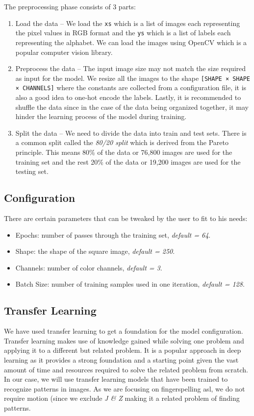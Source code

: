 \documentclass[twocolumn]{article}
\begin{document}
The preprocessing phase consists of 3 parts:
\begin{enumerate}
  \item Load the data – We load the \texttt{xs} which is a list of images each 
  representing the pixel values in RGB format and the \texttt{ys} which is a 
  list of labels each representing the alphabet. We can load the images using 
  OpenCV which is a popular computer vision library.
  \item Preprocess the data – The input image size may not match the size 
  required as input for the model. We resize all the images to the shape 
  \texttt{[SHAPE × SHAPE × CHANNELS]} where the constants are collected from a 
  configuration file, it is also a good idea to one-hot encode the labels. 
  Lastly, it is recommended to shuffle the data since in the case of the data 
  being organized together, it may hinder the learning process of the model 
  during training.
  \item Split the data – We need to divide the data into train and test sets. 
  There is a common split called the \textit{80/20 split} which is derived 
  from the Pareto principle. This means 80\% of the data or 76,800 images are 
  used for the training set and the rest 20\% of the data or 19,200 images are 
  used for the testing set.
\end{enumerate}

\subsection{Configuration}

There are certain parameters that can be tweaked by the user to fit to his needs:
\begin{itemize}
  \item Epochs: number of passes through the training set, \textit{default = 64}.
  \item Shape: the shape of the square image, \textit{default = 250}.
  \item Channels: number of color channels, \textit{default = 3}.
  \item Batch Size: number of training samples used in one iteration, \textit{default = 128}.
\end{itemize}

\subsection{Transfer Learning}

We have used transfer learning to get a foundation for the model 
configuration. Transfer learning makes use of knowledge gained while solving 
one problem and applying it to a different but related problem. It is a 
popular approach in deep learning as it provides a strong foundation and a 
starting point given the vast amount of time and resources required to solve 
the related problem from scratch. In our case, we will use transfer learning 
models that have been trained to recognize patterns in images. As we are 
focusing on fingerspelling \gls{asl}, we do not require motion (since we 
exclude \textit{J \& Z} making it a related problem of finding patterns.
\end{document}
